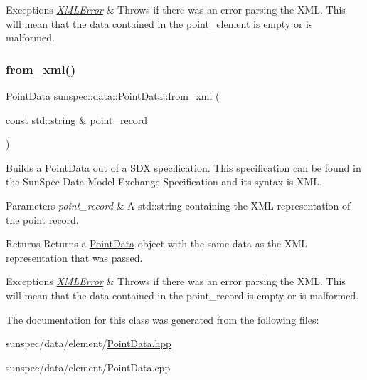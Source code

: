 \begin{DoxyExceptions}{Exceptions}
{\em \hyperlink{classsunspec_1_1data_1_1_x_m_l_error}{X\+M\+L\+Error}} & Throws if there was an error parsing the X\+ML. This will mean that the data contained in the {\ttfamily point\+\_\+element} is empty or is malformed. \\
\hline
\end{DoxyExceptions}
\mbox{\label{structsunspec_1_1data_1_1_point_data_a7e37d673b7ae49753deb3734c3716caf}} 
\subsubsection{\texorpdfstring{from\+\_\+xml()}{from\_xml()}\hspace{0.1cm}{\footnotesize\ttfamily [2/2]}}
{\footnotesize\ttfamily \hyperlink{structsunspec_1_1data_1_1_point_data}{Point\+Data} sunspec\+::data\+::\+Point\+Data\+::from\+\_\+xml (\begin{DoxyParamCaption}\item[{const std\+::string \&}]{point\+\_\+record }\end{DoxyParamCaption})\hspace{0.3cm}{\ttfamily [static]}}

Builds a \hyperlink{structsunspec_1_1data_1_1_point_data}{Point\+Data} out of a S\+DX specification. This specification can be found in the Sun\+Spec Data Model Exchange Specification and its syntax is X\+ML. 
\begin{DoxyParams}{Parameters}
{\em point\+\_\+record} & A {\ttfamily std\+::string} containing the X\+ML representation of the point record. \\
\hline
\end{DoxyParams}
\begin{DoxyReturn}{Returns}
Returns a {\ttfamily \hyperlink{structsunspec_1_1data_1_1_point_data}{Point\+Data}} object with the same data as the X\+ML representation that was passed. 
\end{DoxyReturn}

\begin{DoxyExceptions}{Exceptions}
{\em \hyperlink{classsunspec_1_1data_1_1_x_m_l_error}{X\+M\+L\+Error}} & Throws if there was an error parsing the X\+ML. This will mean that the data contained in the {\ttfamily point\+\_\+record} is empty or is malformed. \\
\hline
\end{DoxyExceptions}


The documentation for this class was generated from the following files\+:\begin{DoxyCompactItemize}
\item 
sunspec/data/element/\hyperlink{_point_data_8hpp}{Point\+Data.\+hpp}\item 
sunspec/data/element/Point\+Data.\+cpp\end{DoxyCompactItemize}
